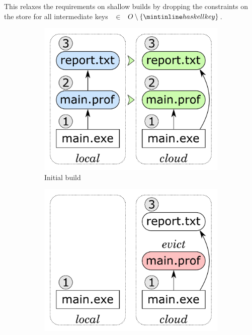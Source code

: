 \noindent
This relaxes the requirements on shallow builds by dropping the constraints on
the  store for all intermediate keys ~$\in$~$O\setminus \{\hs{key}\}$.

\begin{figure}
\begin{subfigure}[b]{0.31\linewidth}
\centerline{\includegraphics[scale=0.26]{fig/frankenbuild-example-build.pdf}}
\caption{Initial build}
\end{subfigure}
\begin{subfigure}[b]{0.31\linewidth}
\centerline{\includegraphics[scale=0.26]{fig/frankenbuild-example-clean.pdf}}

\end{subfigure}
\end{figure}
